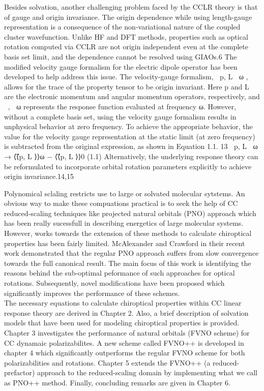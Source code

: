 Besides solvation, another challenging problem faced by the CCLR theory is that of 
gauge and origin invariance.
The origin dependence while using length-gauge representation is a consequence of the non-variational nature of the 
coupled cluster wavefunction. Unlike HF and DFT methods, properties such as optical rotation computed via CCLR 
are not origin independent even at the complete basis set limit, and the dependence cannot be resolved using GIAOs.6 
The modified velocity gauge formalism for the electric dipole operator has been developed to help address this 
issue. The velocity-gauge formalism, ⟨⟨⃗p, L⃗ ⟩⟩ω , allows for the trace of the property tensor to be origin 
invariant. Here ⃗p and L⃗ are the electronic momentum and angular momentum operators, respectively, and 
⟨⟨, ⟩⟩ω represents the response function evaluated at frequency ω. However, without a complete basis
set, using the velocity gauge formalism results in unphysical behavior at zero frequency. To achieve the 
appropriate behavior, the value for the velocity gauge representation at the static limit (at zero frequency) 
is subtracted from the original expression, as shown in Equation 1.1. 13
⟨⟨⃗p, L⃗ ⟩⟩ω → ⟨⟨⃗p, L⃗ ⟩⟩ω − ⟨⟨⃗p, L⃗ ⟩⟩0 (1.1) Alternatively, the underlying response theory can be reformulated to incorporate 
orbital rotation parameters explicitly to achieve origin invariance.14,15

Polynomical sclaling restricts use to large or solvated molecular sytstems.
An obvious way to make these compuations practical is to seek the help of CC reduced-scaling 
techniques like projected natural orbitals (PNO) approach\cite{} which has been really sucessfull in describing energetics of 
large molecular systems. However, works towards the extension of these methods to calculate chiroptical properties has been 
fairly limited\cite{}. McAlexander and Crawford in their recent work\cite{} demonstrated that the regular PNO approach
suffers from slow convergence towards the full canonical result. The main focus of this work is identifying the reasons
behind the sub-optimal peformance of such approaches for optical rotations. Subsequently, novel modifications
have been proposed which significantly improves the performance of these schemes.\\
The necessary equations to calculate chiroptical properties within CC linear response theory are derived in 
Chapter 2. Also, a brief description of solvation models that have been used for modeling chiroptical properties 
is provided. Chapter 3 investigates the performance of natural orbitals (FVNO scheme) for CC dynamaic  polarizabilites.
A new scheme called FVNO++ is developed in chapter 4 which significantly outperforms the regular FVNO scheme
for both polarizabilities and rotations. Chapter 5 extends the FVNO++ (a reduced-prefactor) approach to the reduced-scaling 
domain by implementing what we call as PNO++ method. Finally, concluding remarks are given in Chapter 6.
